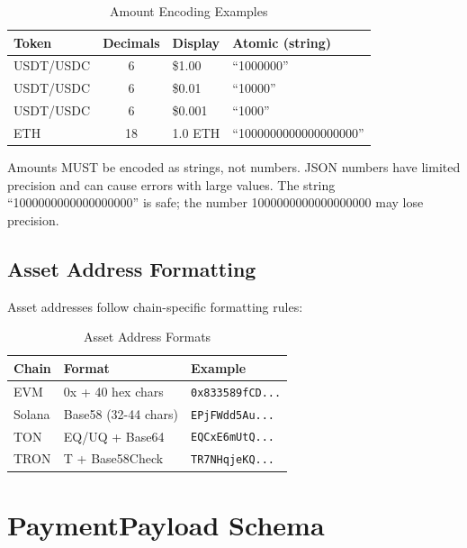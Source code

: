 \begin{table}[htbp]
\centering
\caption{Amount Encoding Examples}
\label{tab:amount-encoding}
\begin{tabular}{l c l l}
\toprule
\textbf{Token} & \textbf{Decimals} & \textbf{Display} & \textbf{Atomic (string)} \\
\midrule
USDT/USDC & 6 & \$1.00 & ``1000000'' \\
USDT/USDC & 6 & \$0.01 & ``10000'' \\
USDT/USDC & 6 & \$0.001 & ``1000'' \\
ETH & 18 & 1.0 ETH & ``1000000000000000000'' \\
\bottomrule
\end{tabular}
\end{table}

\begin{warningbox}
Amounts MUST be encoded as strings, not numbers. JSON numbers have limited precision and can cause errors with large values. The string ``1000000000000000000'' is safe; the number 1000000000000000000 may lose precision.
\end{warningbox}

\subsection{Asset Address Formatting}

Asset addresses follow chain-specific formatting rules:

\begin{table}[htbp]
\centering
\caption{Asset Address Formats}
\label{tab:asset-formats}
\begin{tabular}{l l p{5cm}}
\toprule
\textbf{Chain} & \textbf{Format} & \textbf{Example} \\
\midrule
EVM & 0x + 40 hex chars & \texttt{0x833589fCD...} \\
Solana & Base58 (32-44 chars) & \texttt{EPjFWdd5Au...} \\
TON & EQ/UQ + Base64 & \texttt{EQCxE6mUtQ...} \\
TRON & T + Base58Check & \texttt{TR7NHqjeKQ...} \\
\bottomrule
\end{tabular}
\end{table}

\section{PaymentPayload Schema}
\label{sec:payment-payload}

